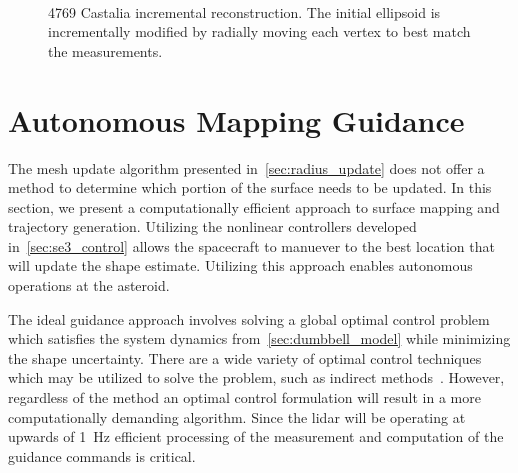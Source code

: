 \begin{figure}[htbp]
    ~
    \caption{4769 Castalia incremental reconstruction. The initial ellipsoid is incrementally modified by radially moving each vertex to best match the measurements.~\label{fig:reconstruction}}
\end{figure}
\section{Autonomous Mapping Guidance}\label{sec:explore_asteroid}

The mesh update algorithm presented in~\cref{sec:radius_update} does not offer a method to determine which portion of the surface needs to be updated. 
In this section, we present a computationally efficient approach to surface mapping and trajectory generation.
Utilizing the nonlinear controllers developed in~\cref{sec:se3_control} allows the spacecraft to manuever to the best location that will update the shape estimate.
Utilizing this approach enables autonomous operations at the asteroid. 

The ideal guidance approach involves solving a global optimal control problem which satisfies the system dynamics from~\cref{sec:dumbbell_model} while minimizing the shape uncertainty.
There are a wide variety of optimal control techniques which may be utilized to solve the problem, such as indirect methods~\cite{kirk2012,bryson1975}.
However, regardless of the method an optimal control formulation will result in a more computationally demanding algorithm.
Since the \gls{lidar} will be operating at upwards of \SI{1}{\hertz} efficient processing of the measurement and computation of the guidance commands is critical.


